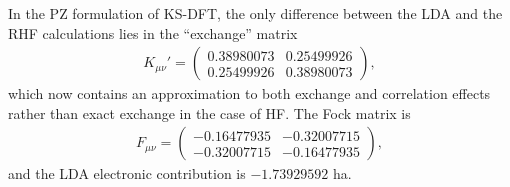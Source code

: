 In the PZ formulation of KS-DFT, the only difference between the LDA and the RHF calculations lies in the ``exchange'' matrix
\begin{align}
K_{\mu\nu}' = \left(\begin{array}{cc}
0.38980073 & 0.25499926 \\
0.25499926 & 0.38980073
\end{array}\right),
\end{align}
which now contains an approximation to both exchange and correlation effects rather than exact exchange in the case of HF. The Fock matrix is
\begin{align}
F_{\mu\nu} = \left(\begin{array}{cc}
-0.16477935 & -0.32007715 \\
-0.32007715 & -0.16477935
\end{array}\right),
\label{eq:h2-lda-fock-r14}
\end{align}
and the LDA electronic contribution is $-1.73929592$ ha.